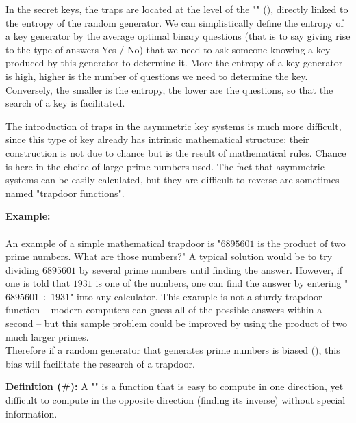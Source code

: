 	In the secret keys, the traps are located at the level of the "" (), directly linked to the entropy of the random generator. We can simplistically define the entropy of a key generator by the average optimal binary questions (that is to say giving rise to the type of answers Yes / No) that we need to ask someone knowing a key produced by this generator to determine it. More the entropy of a key generator is high, higher is the number of questions we need to determine the key. Conversely, the smaller is the entropy, the lower are the questions, so that the search of a key is facilitated.
	
	The introduction of traps in the asymmetric key systems is much more difficult, since this type of key already has intrinsic mathematical structure: their construction is not due to chance but is the result of mathematical rules. Chance is here in the choice of large prime numbers used. The fact that asymmetric systems can be easily calculated, but they are difficult to reverse are sometimes named "trapdoor functions".

	\begin{tcolorbox}[colframe=black,colback=white,sharp corners]
	\textbf{{\Large {}}Example:}\\\\
	An example of a simple mathematical trapdoor is "$6895601$ is the product of two prime numbers. What are those numbers?" A typical solution would be to try dividing $6895601$ by several prime numbers until finding the answer. However, if one is told that $1931$ is one of the numbers, one can find the answer by entering "$6895601\div 1931$" into any calculator. This example is not a sturdy trapdoor function – modern computers can guess all of the possible answers within a second – but this sample problem could be improved by using the product of two much larger primes.\\
	
	Therefore if a random generator that generates prime numbers is biased (), this bias will facilitate the research of a trapdoor.
	\end{tcolorbox}
	
	\textbf{Definition (\#\mydef):} A "" is a function that is easy to compute in one direction, yet difficult to compute in the opposite direction (finding its inverse) without special information.
	
